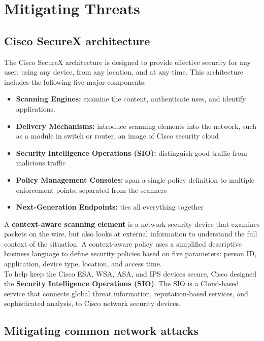 \section{Mitigating Threats}

\subsection{Cisco SecureX architecture}

The Cisco SecureX architecture is designed to provide effective security for any user, using any device, from any location, and at any time. This architecture includes the following five major components:

\begin{itemize}
\item \textbf{Scanning Engines:} examine the content, authenticate uses, and identify applications.
\item \textbf{Delivery Mechanisms:} introduce scanning elements into the network, such as a module in switch or router, an image of Cisco security cloud
\item \textbf{Security Intelligence Operations (SIO):} distinguish good traffic from malicious traffic
\item \textbf{Policy Management Consoles:} span a single policy definition to multiple enforcement points; separated from the scanners
\item \textbf{Next-Generation Endpoints:} ties all everything together
\end{itemize}

A \textbf{context-aware scanning element} is a network security device that examines packets on the wire, but also looks at external information to understand the full context of the situation. A context-aware policy uses a simplified descriptive business language to define security policies based on five parameters: person ID, application, device type, location, and access time.\\

To help keep the Cisco ESA, WSA, ASA, and IPS devices secure, Cisco designed the \textbf{Security Intelligence Operations (SIO)}. The SIO is a Cloud-based service that connects global threat information, reputation-based services, and sophisticated analysis, to Cisco network security devices.

\subsection{Mitigating common network attacks}

